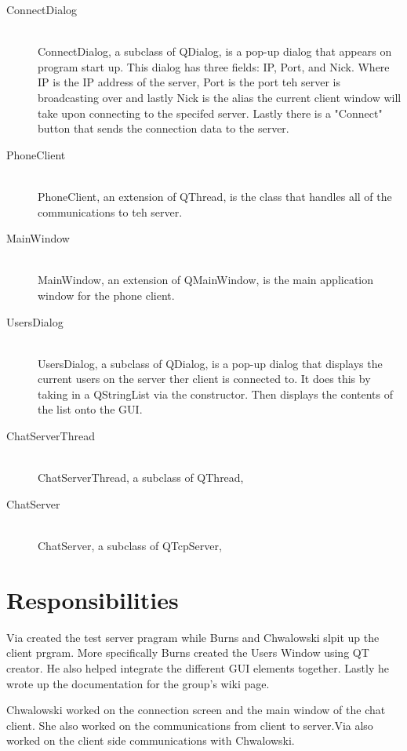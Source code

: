 \documentclass[12pt]{article}
\begin{document}
\begin{description}
\item[ConnectDialog] \hfill \\
ConnectDialog, a subclass of QDialog, is a pop-up dialog that appears on program start up. This dialog has three fields: IP, Port, and Nick. Where IP is the IP address of the server, Port is the port teh server is broadcasting over and lastly Nick is the alias the current client window will take upon connecting to the specifed server. Lastly there is a "Connect" button that sends the connection data to the server.

\item[PhoneClient] \hfill \\
PhoneClient, an extension of QThread, is the class that handles all of the communications to teh server. 

\item[MainWindow] \hfill \\
MainWindow, an extension of QMainWindow, is the main application window for the phone client.

\item[UsersDialog] \hfill \\
UsersDialog, a subclass of QDialog, is a pop-up dialog that displays the current users on the server ther client is connected to. It does this by taking in a QStringList via the constructor. Then displays the contents of the list onto the GUI.

\item[ChatServerThread] \hfill \\
ChatServerThread, a subclass of QThread, 

\item[ChatServer] \hfill \\
ChatServer, a subclass of QTcpServer, 

\end{description}

\section{Responsibilities}
Via created the test server pragram while Burns and Chwalowski slpit up the client prgram. More specifically Burns created the Users Window using QT creator. He also helped integrate the different GUI elements together. Lastly he wrote up the documentation for the group's wiki page. 

Chwalowski worked on the connection screen and the main window of the chat client. She also worked on the communications from client to server.Via also worked on the client side communications with Chwalowski.
\end{document}
